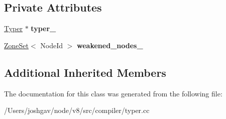 \subsection*{Private Attributes}
\begin{DoxyCompactItemize}
\item 
\hyperlink{classv8_1_1internal_1_1compiler_1_1_typer}{Typer} $\ast$ {\bfseries typer\+\_\+}\hypertarget{classv8_1_1internal_1_1compiler_1_1_typer_1_1_visitor_a41d834cce74f35315f5a03f5f1681b65}{}\label{classv8_1_1internal_1_1compiler_1_1_typer_1_1_visitor_a41d834cce74f35315f5a03f5f1681b65}

\item 
\hyperlink{classv8_1_1internal_1_1_zone_set}{Zone\+Set}$<$ Node\+Id $>$ {\bfseries weakened\+\_\+nodes\+\_\+}\hypertarget{classv8_1_1internal_1_1compiler_1_1_typer_1_1_visitor_a58f71009a45bacc901dccdf736cf4b79}{}\label{classv8_1_1internal_1_1compiler_1_1_typer_1_1_visitor_a58f71009a45bacc901dccdf736cf4b79}

\end{DoxyCompactItemize}
\subsection*{Additional Inherited Members}


The documentation for this class was generated from the following file\+:\begin{DoxyCompactItemize}
\item 
/\+Users/joshgav/node/v8/src/compiler/typer.\+cc\end{DoxyCompactItemize}
